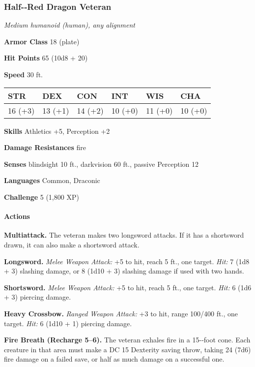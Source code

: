 \documentclass[
]{article}
\begin{document}
\hypertarget{half-red-dragon-veteran}{%
\subsubsection{Half-­‐Red Dragon
Veteran}\label{half-red-dragon-veteran}}

\emph{Medium humanoid (human), any alignment}

\textbf{Armor Class} 18 (plate)

\textbf{Hit Points} 65 (10d8 + 20)

\textbf{Speed} 30 ft.

\begin{longtable}[]{@{}llllll@{}}
\toprule
STR & DEX & CON & INT & WIS & CHA\tabularnewline
\midrule
\endhead
16 (+3) & 13 (+1) & 14 (+2) & 10 (+0) & 11 (+0) & 10 (+0)\tabularnewline
\bottomrule
\end{longtable}

\textbf{Skills} Athletics +5, Perception +2

\textbf{Damage Resistances} fire

\textbf{Senses} blindsight 10 ft., darkvision 60 ft., passive Perception
12

\textbf{Languages} Common, Draconic

\textbf{Challenge} 5 (1,800 XP)

\hypertarget{actions-3}{%
\paragraph{Actions}\label{actions-3}}

\textbf{Multiattack.} The veteran makes two longsword attacks. If it has
a shortsword drawn, it can also make a shortsword attack.

\textbf{Longsword.} \emph{Melee Weapon Attack:} +5 to hit, reach 5 ft.,
one target. \emph{Hit:} 7 (1d8 + 3) slashing damage, or 8 (1d10 + 3)
slashing damage if used with two hands.

\textbf{Shortsword.} \emph{Melee Weapon Attack:} +5 to hit, reach 5 ft.,
one target. \emph{Hit:} 6 (1d6 + 3) piercing damage.

\textbf{Heavy Crossbow.} \emph{Ranged Weapon Attack:} +3 to hit, range
100/400 ft., one target. \emph{Hit:} 6 (1d10 + 1) piercing damage.

\textbf{Fire Breath (Recharge 5--6).} The veteran exhales fire in a
15-­‐foot cone. Each creature in that area must make a DC 15 Dexterity
saving throw, taking 24 (7d6) fire damage on a failed save, or half as
much damage on a successful one.
\end{document}
